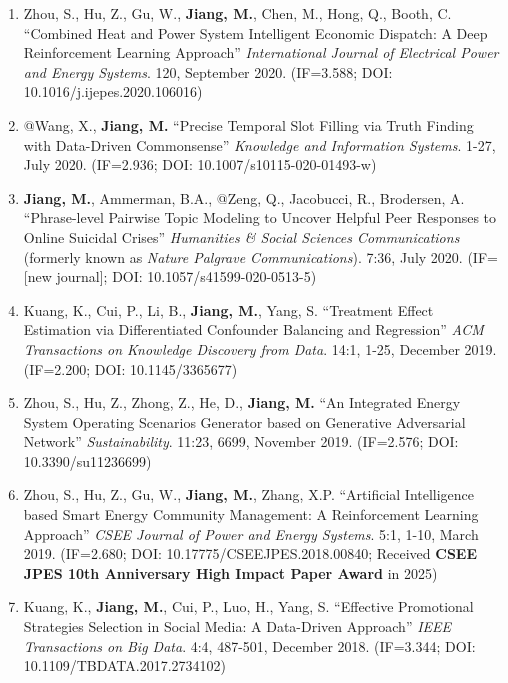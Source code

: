 \documentclass[10pt]{article}
\newenvironment{myindentpar}[1]%
{\begin{list}{}%
         {\setlength{\leftmargin}{#1}}%
         \item[]%
}
{\end{list}}
\newcounter{list}
\begin{document}
\begin{myindentpar}{0.00cm}
\begin{enumerate}[leftmargin=.5cm]
\item[J17] Zhou, S., Hu, Z., Gu, W., \textbf{Jiang, M.}, Chen, M., Hong, Q., Booth, C. ``Combined Heat and Power System Intelligent Economic Dispatch: A Deep Reinforcement Learning Approach'' \textit{International Journal of Electrical Power and Energy Systems}. 120, September 2020. (IF=3.588; DOI: 10.1016/j.ijepes.2020.106016)

\item[J16] @Wang, X., \textbf{Jiang, M.} ``Precise Temporal Slot Filling via Truth Finding with Data-Driven Commonsense'' \textit{Knowledge and Information Systems}. 1-27, July 2020. (IF=2.936; DOI: 10.1007/s10115-020-01493-w)

\item[J15] \textbf{Jiang, M.}, Ammerman, B.A., @Zeng, Q., Jacobucci, R., Brodersen, A. ``Phrase-level Pairwise Topic Modeling to Uncover Helpful Peer Responses to Online Suicidal Crises'' \textit{Humanities \& Social Sciences Communications} (formerly known as \textit{Nature Palgrave Communications}). 7:36, July 2020. (IF=[new journal]; DOI: 10.1057/s41599-020-0513-5)

\item[J14] Kuang, K., Cui, P., Li, B., \textbf{Jiang, M.}, Yang, S. ``Treatment Effect Estimation via Differentiated Confounder Balancing and Regression'' \textit{ACM Transactions on Knowledge Discovery from Data}. 14:1, 1-25, December 2019. (IF=2.200; DOI: 10.1145/3365677)
	
\item[J13] Zhou, S., Hu, Z., Zhong, Z., He, D., \textbf{Jiang, M.} ``An Integrated Energy System Operating Scenarios Generator based on Generative Adversarial Network'' \textit{Sustainability}. 11:23, 6699, November 2019. (IF=2.576; DOI: 10.3390/su11236699)

\item[J12] Zhou, S., Hu, Z., Gu, W., \textbf{Jiang, M.}, Zhang, X.P. ``Artificial Intelligence based Smart Energy Community Management: A Reinforcement Learning Approach'' \textit{CSEE Journal of Power and Energy Systems}. 5:1, 1-10, March 2019. (IF=2.680; DOI: 10.17775/CSEEJPES.2018.00840; Received \textbf{CSEE JPES 10th Anniversary High Impact Paper Award} in 2025)

\item[J11] Kuang, K., \textbf{Jiang, M.}, Cui, P., Luo, H., Yang, S. ``Effective Promotional Strategies Selection in Social Media: A Data-Driven Approach'' \textit{IEEE Transactions on Big Data}. 4:4, 487-501, December 2018. (IF=3.344; DOI: 10.1109/TBDATA.2017.2734102)


\end{enumerate}
\end{myindentpar}
\end{document}
